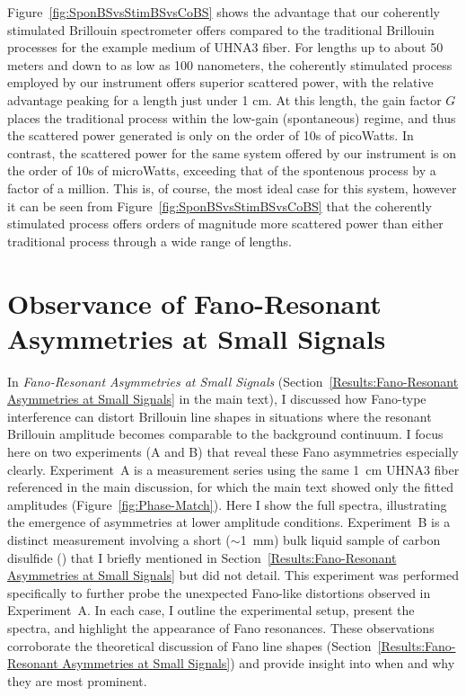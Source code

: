 Figure~\ref{fig:SponBSvsStimBSvsCoBS} shows the advantage that our coherently stimulated Brillouin spectrometer offers compared to the traditional Brillouin processes for the example medium of UHNA3 fiber. For lengths up to about 50 meters and down to as low as 100 nanometers, the coherently stimulated process employed by our instrument offers superior scattered power, with the relative advantage peaking for a length just under 1 cm. At this length, the gain factor $G$ places the traditional process within the low-gain (spontaneous) regime, and thus the scattered power generated is only on the order of 10s of picoWatts. In contrast, the scattered power for the same system offered by our instrument is on the order of 10s of microWatts, exceeding that of the spontenous process by a factor of a million. This is, of course, the most ideal case for this system, however it can be seen from Figure~\ref{fig:SponBSvsStimBSvsCoBS} that the coherently stimulated process offers orders of magnitude more scattered power than either traditional process through a wide range of lengths.

\newpage


\section{Observance of Fano-Resonant Asymmetries at Small Signals}
\label{Appendix:Fano}

In \textit{Fano-Resonant Asymmetries at Small Signals} (Section~\ref{Results:Fano-Resonant Asymmetries at Small Signals} in the main text), I discussed how Fano-type interference can distort Brillouin line shapes in situations where the resonant Brillouin amplitude becomes comparable to the background continuum. I focus here on two experiments (A and B) that reveal these Fano asymmetries especially clearly. Experiment~A is a measurement series using the same \SI{1}{\centi\meter} UHNA3 fiber referenced in the main discussion, for which the main text showed only the fitted amplitudes (Figure~\ref{fig:Phase-Match}). Here I show the full spectra, illustrating the emergence of asymmetries at lower amplitude conditions. Experiment~B is a distinct measurement involving a short (\(\sim\)\SI{1}{\milli\meter}) bulk liquid sample of carbon disulfide () that I briefly mentioned in Section~\ref{Results:Fano-Resonant Asymmetries at Small Signals} but did not detail. This experiment was performed specifically to further probe the unexpected Fano-like distortions observed in Experiment~A. In each case, I outline the experimental setup, present the spectra, and highlight the appearance of Fano resonances. These observations corroborate the theoretical discussion of Fano line shapes (Section~\ref{Results:Fano-Resonant Asymmetries at Small Signals}) and provide insight into when and why they are most prominent.

